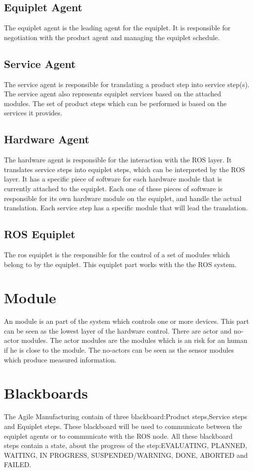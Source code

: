 \documentclass[12pt,a4paper]{report}
\begin{document}
\subsection{Equiplet Agent}
The equiplet agent is the leading agent for the equiplet. It is responsible for negotiation with the product agent and managing the equiplet schedule.\cite{REXOS_Design}
\subsection{Service Agent}
The service agent is responsible for translating a product step into service step(s). The service agent also represents equiplet services based on the attached modules. The set of product steps which can be performed is based on the services it provides.\cite{REXOS_Design}
\subsection{Hardware Agent}
The hardware agent is responsible for the interaction with the ROS layer. It translates service steps into equiplet steps, which can be interpreted by the ROS layer. It has a specific piece of software for each hardware module that is currently attached to the equiplet. Each one of these pieces of software is responsible for its own hardware module on the equiplet, and handle the actual translation. Each service step has a specific module that will lead the translation. \cite{REXOS_Design}
\subsection{ROS Equiplet}
The ros equiplet is the responsible for the control of a set of modules which belong to by the equiplet. This equiplet part works with the the ROS system.

\section{Module}
An module is an part of the system which controls one or more devices. This part can be seen as the lowest layer of the hardware control.
There are actor and no-actor modules. The actor modules are the modules which is an risk for an human if he is close to the module. The no-actors can be seen as the sensor modules which produce measured information.  

\section{Blackboards}
The Agile Manufacturing contain of three blackboard:Product steps,Service steps and Equiplet steps. These blackboard will be used to communicate between the equiplet agents or to communicate with the ROS node. All these blackboard steps contain a state, about the progress of the step:EVALUATING, PLANNED, WAITING, IN PROGRESS, SUSPENDED/WARNING, DONE, ABORTED and FAILED.
\end{document}

